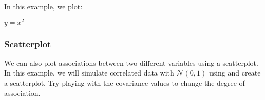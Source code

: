 \documentclass[letterpaper,10pt,english]{sphinxmanual}
\begin{document}
In this example, we plot:

\(y = x^2\)

\begin{sphinxVerbatim}[commandchars=\\\{\}]
    
    

  
\end{sphinxVerbatim}

\begin{sphinxVerbatim}
\end{sphinxVerbatim}

\noindent{}


\subsubsection{Scatterplot}
\label{\detokenize{content/Introduction_to_Plotting:scatterplot}}
We can also plot associations between two different variables using a scatterplot. In this example, we will simulate correlated data with \(\mathcal{N}(0,1)\) using  and create a scatterplot. Try playing with the covariance values to change the degree of association.

\begin{sphinxVerbatim}[commandchars=\\\{\}]
  
  
  \PYG{p}{[} \PYG{p}{]}
  \PYG{p}{[}
    \PYG{p}{[} \PYG{p}{]}
    \PYG{p}{[} \PYG{p}{]}\PYG{p}{]}
    

\PYG{p}{[}\PYG{p}{]} \PYG{p}{[}\PYG{p}{]}
\end{sphinxVerbatim}
\end{document}
